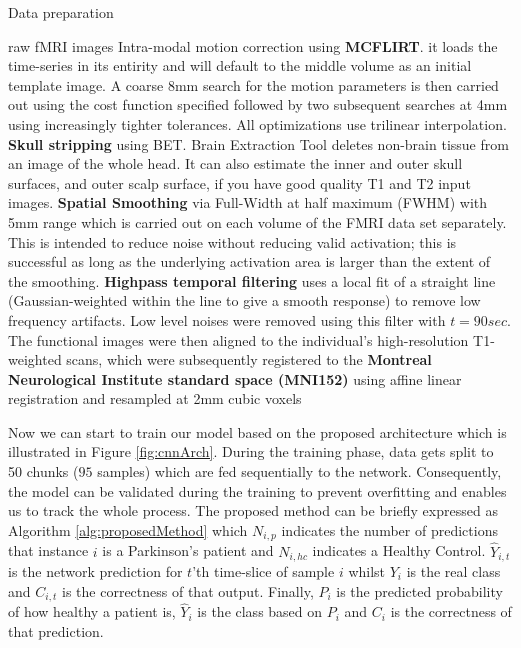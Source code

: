 \documentclass[preprint,12pt]{elsarticle}
\newcommand{\algorithmicinput}{\textbf{input}}
\newcommand{\INPUT}{\item[\algorithmicinput]}
\begin{document}
\begin{algorithm}
	\caption{Data preparation}
	\label{alg:preprocessing}
	
	\begin{algorithmic}[1]
		
		\INPUT{raw fMRI images}
		\STATE Intra-modal motion correction using \textbf{MCFLIRT}. it loads the time-series in its entirity and will default to the middle volume as an initial template image. A coarse 8mm search for the motion parameters is then carried out using the cost function specified followed by two subsequent searches at 4mm using increasingly tighter tolerances. All optimizations use trilinear interpolation.
		\STATE \textbf{Skull stripping} using BET. Brain Extraction Tool deletes non-brain tissue from an image of the whole head. It can also estimate the inner and outer skull surfaces, and outer scalp surface, if you have good quality T1 and T2 input images.
		\STATE \textbf{Spatial Smoothing} via Full-Width at half maximum (FWHM) with 5mm range which is carried out on each volume of the FMRI data set separately. This is intended to reduce noise without reducing valid activation; this is successful as long as the underlying activation area is larger than the extent of the smoothing.
		\STATE \textbf{Highpass temporal filtering} uses a local fit of a straight line (Gaussian-weighted within the line to give a smooth response) to remove low frequency artifacts. Low level noises were removed using this filter with $t = 90 sec$.
		\STATE The functional images were then aligned to the individual's high-resolution T1-weighted scans, which were subsequently registered to the \textbf{Montreal Neurological Institute standard space (MNI152)} using affine linear registration and resampled at 2mm cubic voxels
	\end{algorithmic}
\end{algorithm}



Now we can start to train our model based on the proposed architecture which is illustrated in Figure \ref{fig:cnnArch}. During the training phase, data gets split to 50 chunks ($95$ samples) which are fed sequentially to the network. Consequently, the model can be validated during the training to prevent overfitting and enables us to track the whole process. The proposed method can be briefly expressed as Algorithm \ref{alg:proposedMethod} which $N_{i,p}$ indicates the number of predictions that instance $i$ is a Parkinson's patient and $N_{i,hc}$ indicates a Healthy Control. $\hat{Y}_{i,t}$ is the network prediction for $t$'th time-slice of sample $i$ whilst $Y_i$ is the real class and $C_{i,t}$ is the correctness of that output. Finally, $P_i$ is the predicted probability of how healthy a patient is, $\hat{Y}_i$ is the class based on $P_i$ and $C_i$ is the correctness of that prediction.
\end{document}
